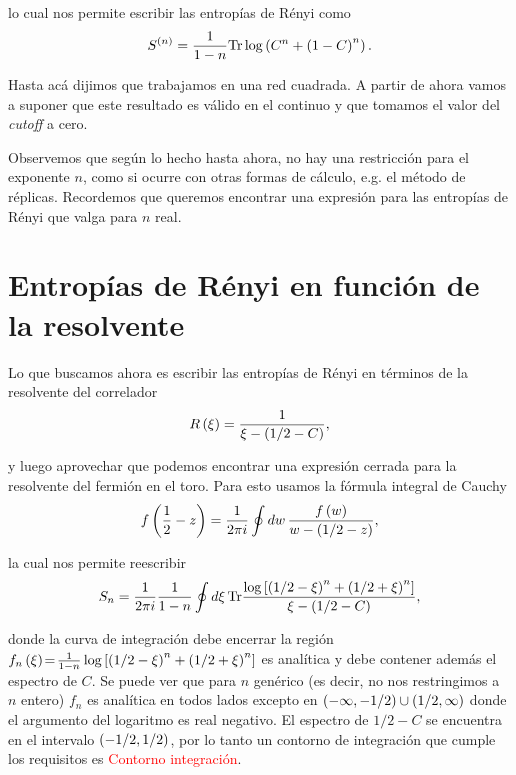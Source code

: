 \documentclass[../main.tex]{subfiles}
\begin{document}
\noindent lo cual nos permite escribir las entropías de Rényi como
\begin{align}
	S^{\left ( n \right )} = \frac 1{1 - n} \text{Tr}\log\left ( C^n + \left ( 1 - C \right )^n \right ).
\end{align}

Hasta acá dijimos que trabajamos en una red cuadrada. A partir de ahora vamos a suponer que este resultado es válido en el continuo y que tomamos el valor del \textit{cutoff} a cero.

Observemos que según lo hecho hasta ahora, no hay una restricción para el exponente $n$, como si ocurre con otras formas de cálculo, e.g. el método de réplicas.
Recordemos que queremos encontrar una expresión para las entropías de Rényi que valga para $n$ real.

\section{Entropías de Rényi en función de la resolvente}

Lo que buscamos ahora es escribir las entropías de Rényi en términos de la resolvente del correlador
\begin{align}
	R\left ( \xi \right ) = \frac 1{\xi - \left ( 1/2 - C \right )},
\end{align}

\noindent y luego aprovechar que podemos encontrar una expresión cerrada para la resolvente del fermión en el toro. Para esto usamos la fórmula integral de Cauchy
\begin{align}
	f\left ( \frac 12 - z \right ) = \frac 1{2 \pi i} \oint dw\, \frac{f\left ( w \right )}{w - \left ( 1/2 - z \right )},
\end{align}

\noindent la cual nos permite reescribir
\begin{align}
	S_n = \frac 1{2 \pi i} \frac 1{1 - n} \oint d\xi\, \text{Tr} \frac{\log\left [ \left ( 1/2 - \xi \right )^n + \left ( 1/2 + \xi \right )^n \right ]}{\xi - \left ( 1/2 - C \right )},
\end{align}

\noindent donde la curva de integración debe encerrar la región $f_n\left ( \xi \right ) \! = \! \frac 1{1 - n}\log\left [ \left ( 1/2 - \xi \right )^n + \left ( 1/2 + \xi \right )^n \right ]$ es analítica y debe contener además el espectro de $C$. Se puede ver que para $n$ genérico (es decir, no nos restringimos a $n$ entero) $f_n$ es analítica en todos lados excepto en $\left ( -\infty, -1/2 \right ) \cup \left ( 1/2, \infty \right )$ donde el argumento del logaritmo es real negativo. El espectro de $1/2 - C$ se encuentra en el intervalo $\left ( -1/2, 1/2 \right )$, por lo tanto un contorno de integración que cumple los requisitos es
\textcolor{red}{Contorno integración}.
\end{document}
